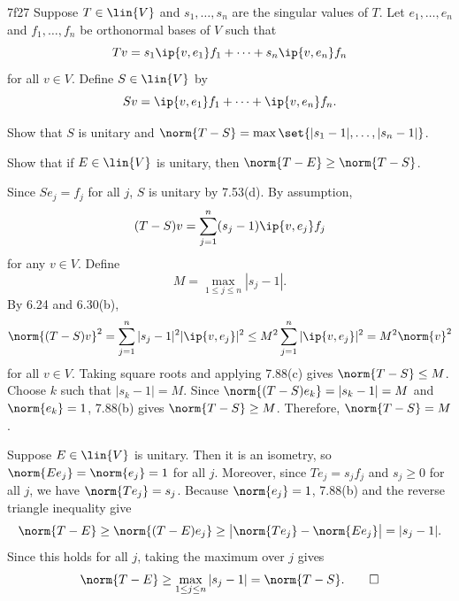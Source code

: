 \begin{exercise}{7f27}
    Suppose $T \in \lin{V}$ and $s_1, \ldots, s_n$ are the singular values of $T$.
    Let $e_1, \ldots, e_n$ and $f_1, \ldots, f_n$ be orthonormal bases of $V$ such that
    \[
        Tv = s_1 \ip{v, e_1} f_1 + \cdots + s_n \ip{v, e_n} f_n
    \]
    for all $v \in V$.
    Define $S \in \lin{V}$ by
    \[
        Sv = \ip{v, e_1} f_1 + \cdots + \ip{v, e_n} f_n.
    \]
    \begin{subexercises}
        \item Show that $S$ is unitary and $\norm{T - S} = \max\set{|s_1 - 1|, \ldots, |s_n - 1|}$.
        \item Show that if $E \in \lin{V}$ is unitary, then $\norm{T - E} \geq \norm{T - S}$.
    \end{subexercises}

\end{exercise}

\begin{solenum}
    \item Since $S e_j = f_j$ for all $j$, $S$ is unitary by 7.53(d).
    By assumption,
    \[
        (T - S)v = \sum_{j=1}^{n} (s_j - 1) \ip{v, e_j} f_j
    \]
    for any $v \in V$.
    Define
    \[
        M = \max_{1 \leq j \leq n} |s_j - 1|.
    \]
    By 6.24 and 6.30(b),
    \[
        \norm{(T - S)v}^2 = \sum_{j=1}^{n} |s_j - 1|^2 |\ip{v, e_j}|^2 \leq M^2 \sum_{j=1}^{n} |\ip{v, e_j}|^2 = M^2 \norm{v}^2
    \]
    for all $v \in V$.
    Taking square roots and applying 7.88(c) gives $\norm{T - S} \leq M$.
    Choose $k$ such that $|s_k - 1| = M$.
    Since $\norm{(T - S) e_k} = |s_k - 1| = M$ and $\norm{e_k} = 1$, 7.88(b) gives $\norm{T - S} \geq M$.
    Therefore, $\norm{T - S} = M$.
    \item Suppose $E \in \lin{V}$ is unitary.
    Then it is an isometry, so $\norm{E e_j} = \norm{e_j} = 1$ for all $j$.
    Moreover, since $T e_j = s_j f_j$ and $s_j \geq 0$ for all $j$, we have $\norm{T e_j} = s_j$.
    Because $\norm{e_j} = 1$, 7.88(b) and the reverse triangle inequality give
    \[
        \norm{T - E} \geq \norm{(T - E) e_j} \geq \bigl| \norm{T e_j} - \norm{E e_j} \bigr| = |s_j - 1|.
    \]
    Since this holds for all $j$, taking the maximum over $j$ gives
    \[
        \norm{T - E} \geq \max_{1 \leq j \leq n} |s_j - 1| = \norm{T - S}. \qedhere
    \]
\end{solenum}

